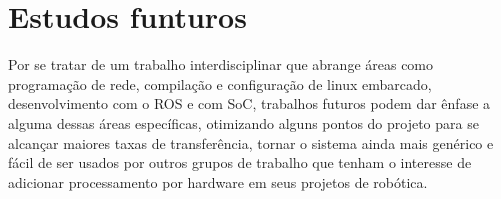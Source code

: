 \chapter{Estudos funturos}

Por se tratar de um trabalho interdisciplinar que abrange áreas como programação de rede, compilação e configuração de linux embarcado, desenvolvimento com o ROS e com SoC, trabalhos futuros podem dar ênfase a alguma dessas áreas específicas, otimizando alguns pontos do projeto para se alcançar maiores taxas de transferência, tornar o sistema ainda mais genérico e fácil de ser usados por outros grupos de trabalho que tenham o interesse de adicionar processamento por hardware em seus projetos de robótica.